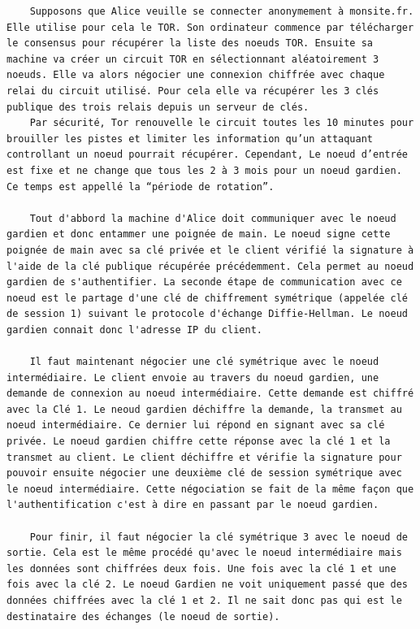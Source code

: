 \documentclass[]{article}
\begin{document}
\begin{verbatim}
    Supposons que Alice veuille se connecter anonymement à monsite.fr. Elle utilise pour cela le TOR. Son ordinateur commence par télécharger le consensus pour récupérer la liste des noeuds TOR. Ensuite sa machine va créer un circuit TOR en sélectionnant aléatoirement 3 noeuds. Elle va alors négocier une connexion chiffrée avec chaque relai du circuit utilisé. Pour cela elle va récupérer les 3 clés publique des trois relais depuis un serveur de clés.
    Par sécurité, Tor renouvelle le circuit toutes les 10 minutes pour brouiller les pistes et limiter les information qu’un attaquant controllant un noeud pourrait récupérer. Cependant, Le noeud d’entrée est fixe et ne change que tous les 2 à 3 mois pour un noeud gardien. Ce temps est appellé la “période de rotation”.

    Tout d'abbord la machine d'Alice doit communiquer avec le noeud gardien et donc entammer une poignée de main. Le noeud signe cette poignée de main avec sa clé privée et le client vérifié la signature à l'aide de la clé publique récupérée précédemment. Cela permet au noeud gardien de s'authentifier. La seconde étape de communication avec ce noeud est le partage d'une clé de chiffrement symétrique (appelée clé de session 1) suivant le protocole d'échange Diffie-Hellman. Le noeud gardien connait donc l'adresse IP du client.

    Il faut maintenant négocier une clé symétrique avec le noeud intermédiaire. Le client envoie au travers du noeud gardien, une demande de connexion au noeud intermédiaire. Cette demande est chiffré avec la Clé 1. Le neoud gardien déchiffre la demande, la transmet au noeud intermédiaire. Ce dernier lui répond en signant avec sa clé privée. Le noeud gardien chiffre cette réponse avec la clé 1 et la transmet au client. Le client déchiffre et vérifie la signature pour pouvoir ensuite négocier une deuxième clé de session symétrique avec le noeud intermédiaire. Cette négociation se fait de la même façon que l'authentification c'est à dire en passant par le noeud gardien.

    Pour finir, il faut négocier la clé symétrique 3 avec le noeud de sortie. Cela est le même procédé qu'avec le noeud intermédiaire mais les données sont chiffrées deux fois. Une fois avec la clé 1 et une fois avec la clé 2. Le noeud Gardien ne voit uniquement passé que des données chiffrées avec la clé 1 et 2. Il ne sait donc pas qui est le destinataire des échanges (le noeud de sortie).
\end{verbatim}
\end{document}
